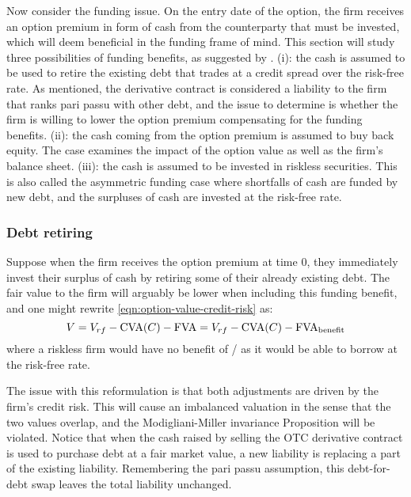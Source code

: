 \documentclass[../main.tex]{subfiles}
\begin{document}
        Now consider the funding issue. On the entry date of the option, 
        the firm receives an option premium in form of cash from the counterparty that must be invested, 
        which will deem beneficial in the funding frame of mind. 
        This section will study three possibilities of funding benefits, 
        as suggested by \cite{Hillion2016}.
        (i): the cash is assumed to be used to retire the existing debt 
        that trades at a credit spread over the risk-free rate. 
        As mentioned, the derivative contract is considered a liability to the firm
        that ranks pari passu with other debt, 
        and the issue to determine is whether the firm is willing to lower the option premium 
        compensating for the funding benefits. 
        (ii): the cash coming from the option premium is assumed to buy back equity. 
        The case examines the impact of the option value as well as the firm's balance sheet. 
        (iii): the cash is assumed to be invested in riskless securities. 
        This is also called the asymmetric funding case where shortfalls of cash are funded by new debt, 
        and the surpluses of cash are invested at the risk-free rate.

        \subsubsection{Debt retiring}
            Suppose when the firm receives the option premium at time 0, 
            they immediately invest their surplus of cash by retiring some of their already existing debt. 
            The fair value to the firm will arguably be lower when including this funding benefit, 
            and one might rewrite \cref{eqn:option-value-credit-risk} as:
            \begin{equation}
                V = V_{rf} - \text{\CVA/}(C) - \text{\FVA/} = V_{rf} - \text{\CVA/}(C) - \text{\FVA/}_{\text{benefit}}
            \end{equation}
            where a riskless firm would have no benefit of \FVA/ as it would be able to borrow at the risk-free rate.
            
            The issue with this reformulation is that both adjustments are driven by the firm's credit risk. 
            This will cause an imbalanced valuation in the sense that the two values overlap, 
            and the Modigliani-Miller invariance Proposition will be violated. 
            Notice that when the cash raised by selling the OTC derivative contract 
            is used to purchase debt at a fair market value, a new liability is replacing a part of the existing liability. 
            Remembering the pari passu assumption, this debt-for-debt swap leaves the total liability unchanged.
\end{document}
